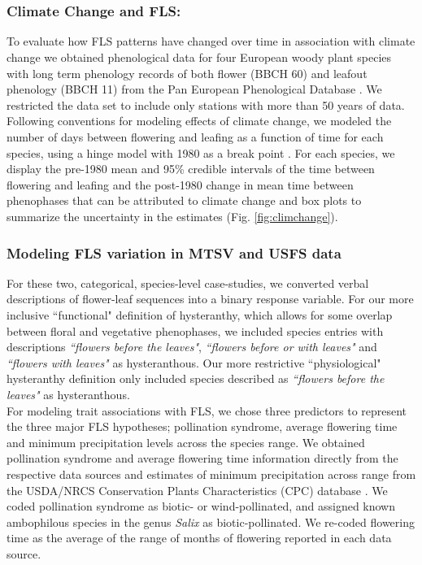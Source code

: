 \documentclass[11pt]{article}
\begin{document}
\pagebreak[4]

\section*{}\label{Methods S1}

\subsubsection*{Climate Change and FLS:}
\noindent To evaluate how FLS patterns have changed over time in association with climate change we obtained phenological data for four European woody plant species with long term phenology records of both flower (BBCH 60) and leafout phenology (BBCH 11) from the Pan European Phenological Database \citep{PEP725}. We restricted the data set to include only stations with more than 50 years of data. Following conventions for modeling effects of climate change, we modeled the number of days between flowering and leafing as a function of time for each species, using a hinge model with 1980 as a break point \citep{IPCC2013,Kharouba2018}. For each species, we display the pre-1980 mean and 95\% credible intervals of the time between flowering and leafing and the post-1980 change in mean time between phenophases that can be attributed to climate change and box plots to summarize the uncertainty in the estimates (Fig. \ref{fig:climchange}).

\subsubsection*{Modeling FLS variation in MTSV and USFS data}
\noindent For these two, categorical, species-level case-studies, we converted verbal descriptions of flower-leaf sequences into a binary response variable. For our more inclusive ``functional" definition of hysteranthy, which allows for some overlap between floral and vegetative phenophases, we included species entries with descriptions \textit{``flowers before the leaves"}, \textit{``flowers before or with leaves"} and \textit{``flowers with leaves"} as hysteranthous. Our more restrictive ``physiological" hysteranthy definition only included species described as \textit{``flowers before the leaves"} as hysteranthous.\\

\noindent For modeling trait associations with FLS, we chose three predictors to represent the three major FLS hypotheses; pollination syndrome, average flowering time and minimum precipitation levels across the species range. We obtained pollination syndrome and average flowering time information directly from the respective data sources and estimates of minimum precipitation across range from the USDA/NRCS Conservation Plants Characteristics (CPC) database \citep{usdancrs}. We coded pollination syndrome as biotic- or wind-pollinated, and assigned known ambophilous species in the genus \textit{Salix} as biotic-pollinated. We re-coded flowering time as the average of the range of months of flowering reported in each data source.\\
\end{document}
